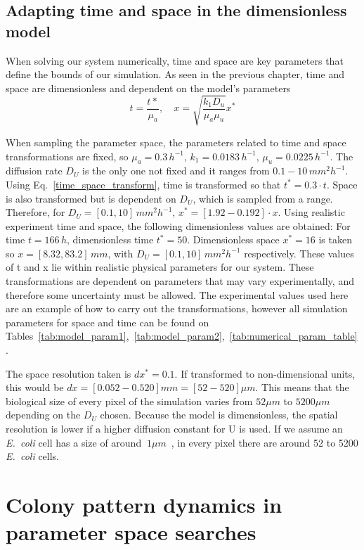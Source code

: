 \subsection{Adapting time and space in the dimensionless model}
When solving our system numerically, time and space are key parameters that define the bounds of our simulation.
As seen in the previous chapter, time and space are dimensionless and dependent on the model’s parameters
\begin{equation}\label{time_space_transform}
    t = \frac{t*}{\mu _a}, \quad x = \sqrt{\frac{k_{1}D_{u}}{\mu_{a}\mu_{u}}}x^*
\end{equation}

When sampling the parameter space, the parameters related to time and space transformations are fixed, so $\mu_a = 0.3 \,h^{-1}, \,k_1 = 0.0183 \,h^{-1},\, \mu_u = 0.0225\, h^{-1}$.
The diffusion rate $D_U$ is the only one not fixed and it ranges from $0.1-10 \,mm^2h^{-1}$.
Using Eq.~\ref{time_space_transform}, time is transformed so that $t^*=0.3\cdot t$.
Space is also transformed but is dependent on $D_U$, which is sampled from a range.
Therefore, for $D_U = [0.1, 10] \,mm^2 h^{-1}$, $x^* =[1.92 - 0.192] \cdot x$.
Using realistic experiment time and space, the following dimensionless values are obtained:
For time $t=166\,h$, dimensionless time $t^*=50$.
Dimensionless space  $x^*=16$ is taken so  $x = [8.32, 83.2] \,mm$, with $D_U = [0.1, 10]\, mm^2 h^{-1}$ respectively.
These values of t and x lie within realistic physical parameters for our system.
These transformations are dependent on parameters that may vary experimentally, and therefore some uncertainty must be allowed.
The experimental values used here are an example of how to carry out the transformations, however all simulation parameters for space and time can be found on Tables~\ref{tab:model_param1},~\ref{tab:model_param2},~\ref{tab:numerical_param_table}.

The space resolution taken is $dx^*=0.1$.
If transformed to non-dimensional units, this would be $dx =[0.052-0.520] mm = [52-520] \mu m$.
This means that the biological size of every pixel of the simulation varies from $52\mu m$ to $5200\mu m$ depending on the $D_{U}$ chosen.
Because the model is dimensionless, the spatial resolution is lower if a higher diffusion constant for U is used.
If we assume an \textit{E.~coli} cell has a size of around $~1\mu m$~\parencite{shiomi2009genetic}, in every pixel there are around 52 to 5200 \textit{E.~coli} cells.
\section{Colony pattern dynamics in parameter space searches}

